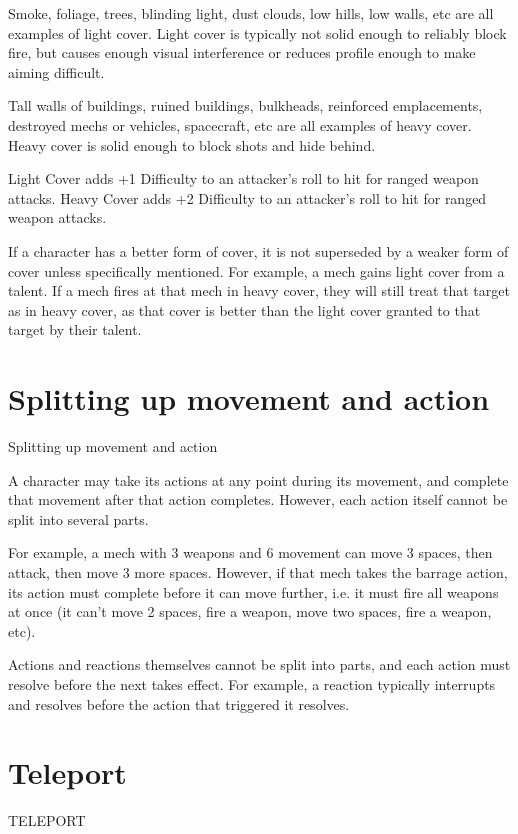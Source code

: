                                                                                                                     


Smoke, foliage, trees, blinding light, dust clouds, low hills, low walls, etc are all examples of light 
cover. Light cover is typically not solid enough to reliably block fire, but causes enough visual 
interference or reduces profile enough to make aiming difficult. 

Tall walls of buildings, ruined buildings, bulkheads, reinforced emplacements, destroyed mechs 
or vehicles, spacecraft, etc are all examples of heavy cover. Heavy cover is solid enough to 
block shots and hide behind. 

Light Cover adds +1 Difficulty to an attacker’s roll to hit for ranged weapon attacks. 
Heavy Cover adds +2 Difficulty to an attacker’s roll to hit for ranged weapon attacks. 

If a character has a better form of cover, it is not superseded by a weaker form of cover unless 
specifically mentioned. For example, a mech gains light cover from a talent. If a mech fires at that 
mech in heavy cover, they will still treat that target as in heavy cover, as that cover is better than 
the light cover granted to that target by their talent. 

\section{Splitting up movement and action}
                              Splitting up movement and action 

A character may take its actions at any point during its movement, and complete that movement 
after that action completes. However, each action itself cannot be split into several parts. 

For example, a mech with 3 weapons and 6 movement can move 3 spaces, then attack, then 
move 3 more spaces. However, if that mech takes the barrage action, its action must complete 
before it can move further, i.e. it must fire all weapons at once (it can’t move 2 spaces, fire a 
weapon, move two spaces, fire a weapon, etc). 

Actions and reactions themselves cannot be split into parts, and each action must resolve before 
the next takes effect. For example, a reaction typically interrupts and resolves before the action 
that triggered it resolves. 

\section{Teleport}
                                                TELEPORT 

